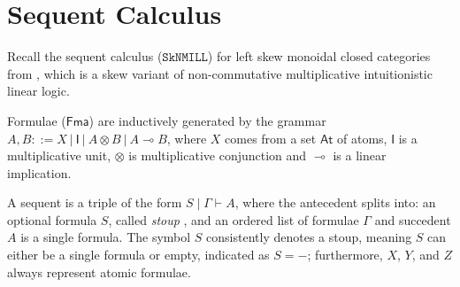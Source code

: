 \documentclass[sn-mathphys-num]{sn-jnl}%
\newcommand{\vd}{\vdash}
\newcommand{\ot}{\otimes}
\newcommand{\lolli}{\multimap}
\newcommand{\unit}{\mathsf{I}}
\newcommand{\SkNMILL}{$\mathtt{SkNMILL}$}
\newcommand{\SkBiCT}{$\mathtt{SkBiCT}$}
\newcommand{\SkBiCA}{$\mathtt{SkBiCA}$}
\newcommand{\mf}[1]{\mathsf{#1}}
\theoremstyle{thmstyleone}%
\theoremstyle{thmstyletwo}%
\theoremstyle{thmstylethree}%
\begin{document}

\section{Sequent Calculus}\label{sec:syntax}
Recall the sequent calculus (\SkNMILL) for left skew monoidal closed categories from \cite{UVW:protsn}, which is a skew variant of non-commutative multiplicative intuitionistic linear logic.

Formulae ($\mf{Fma}$) are inductively generated by the grammar $A, B::= X \ | \ \unit \ | \ A \ot B \ | \ A \lolli B$, where $X$ comes from a set $\mathsf{At}$ of atoms, $\unit$ is a multiplicative unit, $\ot$ is multiplicative conjunction and $\lolli$ is a linear implication.

A sequent is a triple of the form $S \mid \Gamma \vd A$, where the antecedent splits into: an optional formula $S$, called \emph{stoup} \cite{girard:constructive:91}, and an ordered list of formulae $\Gamma$ and succedent $A$ is a single formula.
The symbol $S$ consistently denotes a stoup, meaning $S$ can either be a single formula or empty, indicated as $S = {-}$; furthermore, $X$, $Y$, and $Z$ always represent atomic formulae.
\end{document}
